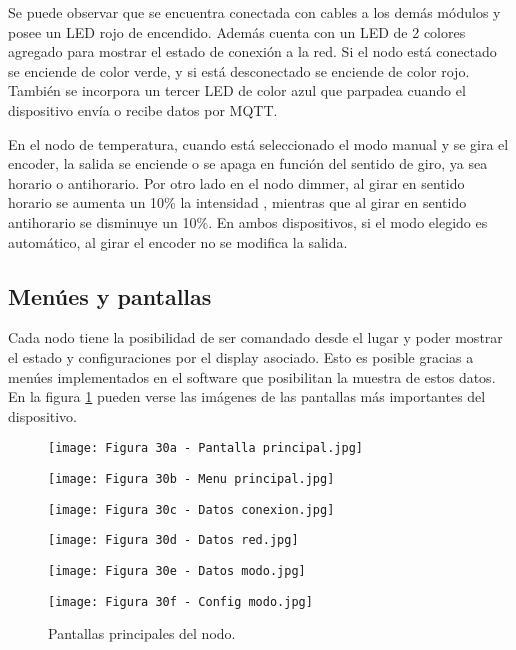 Se puede observar que se encuentra conectada con cables a los demás módulos y posee un LED rojo de encendido. Además cuenta con un LED de 2 colores agregado para mostrar el estado de conexión a la red. Si el nodo está conectado se enciende de color verde, y si está desconectado se enciende de color rojo. También se incorpora un tercer LED de color azul que parpadea cuando el dispositivo envía o recibe datos por MQTT.

En el nodo de temperatura, cuando está seleccionado el modo manual y se gira el encoder, la salida se enciende o se apaga en función del sentido de giro, ya sea horario o antihorario. Por otro lado en el nodo dimmer, al girar en sentido horario se aumenta un 10\% la intensidad , mientras que al girar en sentido antihorario se disminuye un 10\%. En ambos dispositivos, si el modo elegido es automático, al girar el encoder no se modifica la salida.

\subsection{Menúes y pantallas}

Cada nodo tiene la posibilidad de ser comandado desde el lugar y poder mostrar el estado y configuraciones por el display asociado. Esto es posible gracias a menúes implementados en el software que posibilitan la muestra de estos datos. En la figura \ref{fig:30} pueden verse las imágenes de las pantallas más importantes del dispositivo.

\begin{figure}[h]
\centering
\begin{minipage}{0.32\textwidth}
  \centering
  \texttt{[image: Figura 30a - Pantalla principal.jpg]}
\end{minipage}%
\begin{minipage}{0.32\textwidth}
  \centering
  \texttt{[image: Figura 30b - Menu principal.jpg]}
\end{minipage}
\begin{minipage}{0.32\textwidth}
  \centering
  \texttt{[image: Figura 30c - Datos conexion.jpg]}
\end{minipage}
\end{figure}
\begin{figure}[h]
\centering
\begin{minipage}{0.32\textwidth}
  \centering
  \texttt{[image: Figura 30d - Datos red.jpg]}
\end{minipage}
\begin{minipage}{0.32\textwidth}
  \centering
  \texttt{[image: Figura 30e - Datos modo.jpg]}
\end{minipage}
\begin{minipage}{0.32\textwidth}
  \centering
  \texttt{[image: Figura 30f - Config modo.jpg]}
\end{minipage}
\caption[Pantallas principales del nodo]{Pantallas principales del nodo.}
\label{fig:30}
\end{figure}

